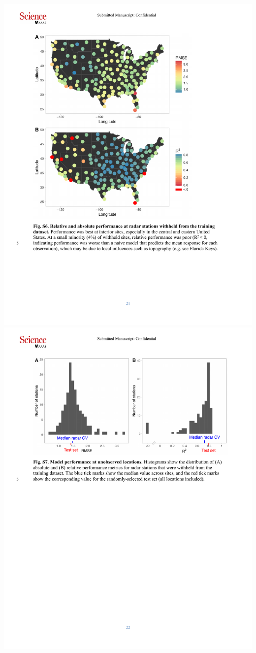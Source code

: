 \documentclass[a4paper, twoside]{templates/ociamthesis}
\begin{document}
\includegraphics[width=1\linewidth]{pdf_chapters/forecast/forecast_supp_crop_Part11}
\includegraphics[width=1\linewidth]{pdf_chapters/forecast/forecast_supp_crop_Part12}
\end{document}
